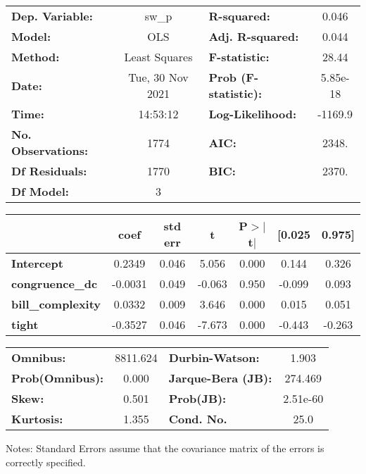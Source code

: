 \begin{center}
\begin{tabular}{lclc}
\toprule
\textbf{Dep. Variable:}    &      sw\_p       & \textbf{  R-squared:         } &     0.046   \\
\textbf{Model:}            &       OLS        & \textbf{  Adj. R-squared:    } &     0.044   \\
\textbf{Method:}           &  Least Squares   & \textbf{  F-statistic:       } &     28.44   \\
\textbf{Date:}             & Tue, 30 Nov 2021 & \textbf{  Prob (F-statistic):} &  5.85e-18   \\
\textbf{Time:}             &     14:53:12     & \textbf{  Log-Likelihood:    } &   -1169.9   \\
\textbf{No. Observations:} &        1774      & \textbf{  AIC:               } &     2348.   \\
\textbf{Df Residuals:}     &        1770      & \textbf{  BIC:               } &     2370.   \\
\textbf{Df Model:}         &           3      & \textbf{                     } &             \\
\bottomrule
\end{tabular}
\begin{tabular}{lcccccc}
                          & \textbf{coef} & \textbf{std err} & \textbf{t} & \textbf{P$> |$t$|$} & \textbf{[0.025} & \textbf{0.975]}  \\
\midrule
\textbf{Intercept}        &       0.2349  &        0.046     &     5.056  &         0.000        &        0.144    &        0.326     \\
\textbf{congruence\_dc}   &      -0.0031  &        0.049     &    -0.063  &         0.950        &       -0.099    &        0.093     \\
\textbf{bill\_complexity} &       0.0332  &        0.009     &     3.646  &         0.000        &        0.015    &        0.051     \\
\textbf{tight}            &      -0.3527  &        0.046     &    -7.673  &         0.000        &       -0.443    &       -0.263     \\
\bottomrule
\end{tabular}
\begin{tabular}{lclc}
\textbf{Omnibus:}       & 8811.624 & \textbf{  Durbin-Watson:     } &    1.903  \\
\textbf{Prob(Omnibus):} &   0.000  & \textbf{  Jarque-Bera (JB):  } &  274.469  \\
\textbf{Skew:}          &   0.501  & \textbf{  Prob(JB):          } & 2.51e-60  \\
\textbf{Kurtosis:}      &   1.355  & \textbf{  Cond. No.          } &     25.0  \\
\bottomrule
\end{tabular}
\end{center}

Notes: \newline
 [1] Standard Errors assume that the covariance matrix of the errors is correctly specified.